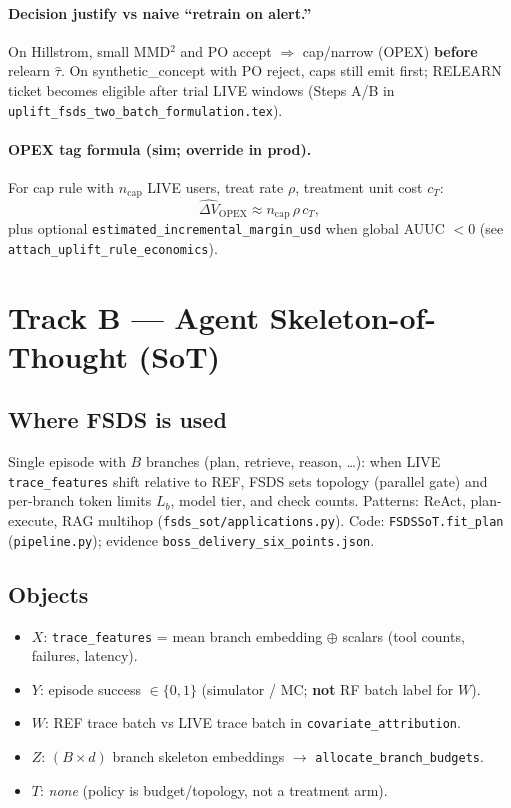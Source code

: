 \documentclass[11pt]{article}
\begin{document}
\paragraph{Decision justify vs naive ``retrain on alert.''}
On Hillstrom, small MMD$^2$ and PO accept $\Rightarrow$ cap/narrow (OPEX) \textbf{before} relearn $\hat\tau$.
On synthetic\_concept with PO reject, caps still emit first; RELEARN ticket becomes eligible after trial LIVE windows (Steps A/B in \texttt{uplift\_fsds\_two\_batch\_formulation.tex}).

\paragraph{OPEX tag formula (sim; override in prod).}
For cap rule with $n_{\mathrm{cap}}$ LIVE users, treat rate $\rho$, treatment unit cost $c_T$:
\begin{equation}
\label{eq:uplift_opex}
\widehat{\Delta V}_{\mathrm{OPEX}} \approx n_{\mathrm{cap}}\,\rho\, c_T,
\end{equation}
plus optional \texttt{estimated\_incremental\_margin\_usd} when global AUUC $<0$ (see \texttt{attach\_uplift\_rule\_economics}).

\section{Track B --- Agent Skeleton-of-Thought (SoT)}

\subsection{Where FSDS is used}
Single episode with $B$ branches (plan, retrieve, reason, \ldots): when LIVE \texttt{trace\_features} shift relative to REF, FSDS sets topology (parallel gate) and per-branch token limits $L_b$, model tier, and check counts.
Patterns: ReAct, plan-execute, RAG multihop (\texttt{fsds\_sot/applications.py}).
Code: \texttt{FSDSSoT.fit\_plan} (\texttt{pipeline.py}); evidence \texttt{boss\_delivery\_six\_points.json}.

\subsection{Objects}
\begin{itemize}[nosep]
  \item $X$: \texttt{trace\_features} = mean branch embedding $\oplus$ scalars (tool counts, failures, latency).
  \item $Y$: episode success $\in\{0,1\}$ (simulator / MC; \textbf{not} RF batch label for $W$).
  \item $W$: REF trace batch vs LIVE trace batch in \texttt{covariate\_attribution}.
  \item $Z$: $(B\times d)$ branch skeleton embeddings $\rightarrow$ \texttt{allocate\_branch\_budgets}.
  \item $T$: \emph{none} (policy is budget/topology, not a treatment arm).
\end{itemize}
\end{document}
